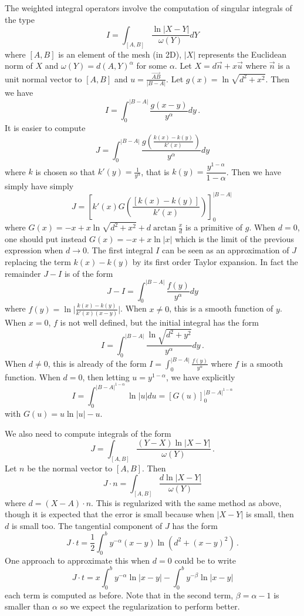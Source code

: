 \documentclass[french]{article}
\begin{document}
The weighted integral operators involve the computation of singular integrals of the type
\[I = \int_{[A,B]} \frac{\ln|X-Y|}{\omega(Y)}dY\]
where $[A,B]$ is an element of the mesh (in 2D), $|X|$ represents the Euclidean norm of $X$ and $\omega(Y) = d(A,Y)^\alpha$ for some $\alpha$. 
Let $X = d\vec{n} + x \vec u$ where $\vec n$ is a unit normal vector to $[A,B]$ and $u = \frac{\overrightarrow{AB}}{|B-A|}$. Let $g(x) = \ln\sqrt{d^2 + x^2}$. Then we have
\[I = \int_{0}^{|B - A|} \frac{g(x-y)}{y^\alpha}dy\,.\]
It is easier to compute 
\[J = \int_{0}^{|B - A|} \frac{g\left(\frac{k(x)-k(y)}{k'(x)}\right)}{y^\alpha}dy\]
where $k$ is chosen so that $k'(y) = \frac{1}{y^\alpha}$, that is $k(y) = \dfrac{y^{1 - \alpha}}{1-\alpha}$. Then we have simply have simply
\[J = \left[k'(x)G\left(\frac{[k(x) - k(y)]}{k'(x)}\right)\right]_{0}^{|B-A|}\,\]
where $G(x) = - x + x\ln\sqrt{d^2 + x^2} + d \arctan\frac{x}{d}$ is a primitive of $g$. When $d = 0$, one should put instead $G(x) = -x + x\ln|x|$ which is the limit of the previous expression when $d \to 0$.   
The first integral $I$ can be seen as an approximation of $J$ replacing the term $k(x) - k(y)$ by its first order Taylor expansion.
In fact the remainder $J - I$ is of the form
\[J - I = \int_{0}^{|B - A|} \frac{f(y)}{y^\alpha}dy\]
where $f(y) = \ln  \lvert \frac{k(x) - k(y)}{k'(x)(x - y)}\rvert$. When $x \neq 0$, this is a smooth function of $y$. When $x= 0$, $f$ is not well defined, but the initial integral has the form
\[I = \int_0^{|B-A|}  \frac{\ln\sqrt{d^2 + y^2}}{y^\alpha}dy\,.\]
When $d \neq 0$, this is already of the form $I = \int_{0}^{|B - A|}\frac{f(y)}{y^\alpha}$ where $f$ is a smooth function. When $d = 0$, then letting $u = y^{1 - \alpha}$, we have explicitly 
\[I = \int_{0}^{|B-A|^{1 - \alpha}} \ln |u| du = \left[G(u)\right]_{0}^{|B-A|^{1 - \alpha}}\]
with $G(u) = u\ln|u| - u$.  

We also need to compute integrals of the form
\[J = \int_{[A,B]} \frac{(Y-X)\ln|X - Y|}{\omega(Y)}\,.\]
Let $n$ be the normal vector to $[A,B]$. Then 
\[J\cdot n = \int_{[A,B]} \frac{d \ln |X - Y|}{\omega(Y)}\]
where $d = (X - A) \cdot n$. This is regularized with the same method as above, though it is expected that the error is small because when $|X - Y|$ is small, then $d$ is small too. 
The tangential component of $J$ has the form 
\[J \cdot t = \frac{1}{2}\int_{0}^b y^{-\alpha} (x - y)\ln (d^2 + (x-y)^2)\,.\]
One approach to approximate this when $d = 0$ could be to write 
\[J \cdot t =x \int_{0}^b y^{-\alpha} \ln|x - y| - \int_{0}^by^{-\beta} \ln|x -y|\]
each term is computed as before. Note that in the second term, $\beta = \alpha - 1$ is smaller than $\alpha$ so we expect the regularization to perform better.  
\end{document}
